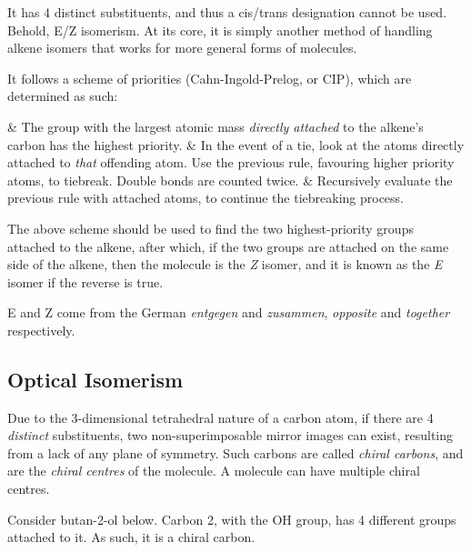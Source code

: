 
			It has 4 distinct substituents, and thus a cis/trans designation cannot be used. Behold, E/Z isomerism. At its core, it
			is simply another method of handling alkene isomers that works for more general forms of molecules.

			It follows a scheme of priorities (Cahn-Ingold-Prelog, or CIP), which are determined as such:
			\begin{romanlist}
				& The group with the largest atomic mass \textit{directly attached} to the alkene's carbon has the highest priority.
				& In the event of a tie, look at the atoms directly attached to \textit{that} offending atom. Use the previous
				  rule, favouring higher priority atoms, to tiebreak. Double bonds are counted twice.
				& Recursively evaluate the previous rule with attached atoms, to continue the tiebreaking process.
			\end{romanlist}

			The above scheme should be used to find the two highest-priority groups attached to the alkene, after which, if the two
			groups are attached on the same side of the alkene, then the molecule is the \textit{Z} isomer, and it is known as the
			\textit{E} isomer if the reverse is true.

			E and Z come from the German \textit{entgegen} and \textit{zusammen}, \textit{opposite} and \textit{together}
			respectively.



		\pagebreak
		\subsection{Optical Isomerism}

			Due to the 3-dimensional tetrahedral nature of a carbon atom, if there are 4 \textit{distinct} substituents, two
			non-superimposable mirror images can exist, resulting from a lack of any plane of symmetry. Such carbons are called
			\textit{chiral carbons}, and are the \textit{chiral centres} of the molecule. A molecule can have multiple chiral
			centres.

			Consider butan-2-ol below. Carbon 2, with the OH group, has 4 different groups attached to it. As such, it is a chiral carbon.

